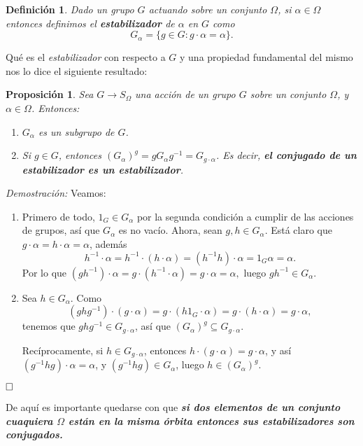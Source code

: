 \documentclass[12pt]{article}
\newtheorem{proposition}[theorem]{Proposición}
\newtheorem{definition}[theorem]{Definición}
\begin{document}
\begin{definition}Dado un grupo $G$ actuando sobre un conjunto $\Omega$, si $\alpha \in \Omega$ entonces definimos el \textbf{estabilizador} de $\alpha$ en $G$ como $$G_\alpha = \lbrace g \in G : g\cdot \alpha = \alpha \rbrace.$$
\end{definition}

Qué es el \textit{estabilizador} con respecto a $G$ y una propiedad fundamental del mismo nos lo dice el siguiente resultado:

\begin{proposition}\label{eq:coest}
Sea $G \longrightarrow S_\Omega$ una acción de un grupo $G$ sobre un conjunto $\Omega$, y $\alpha \in \Omega$. Entonces:

\begin{enumerate}
\item $G_{\alpha}$ es un subgrupo de $G$.
\item Si $g \in G$, entonces $(G_{\alpha})^{g} = gG_{\alpha}g^{-1} = G_{g \cdot \alpha}$. Es decir, \textbf{el conjugado de un estabilizador es un estabilizador}.
\end{enumerate}
\end{proposition}
\emph{Demostración: }Veamos:
\begin{enumerate}
\item Primero de todo, $1_{G} \in G_{\alpha}$ por la segunda condición a cumplir de las acciones de grupos, así que $G_{\alpha}$ es no vacío. Ahora, sean $g,h \in G_{\alpha}$. Está claro que $g \cdot \alpha = h \cdot \alpha = \alpha$, además $$h^{-1} \cdot \alpha = h^{-1}\cdot(h \cdot \alpha) = (h^{-1}h)\cdot \alpha = 1_{G} \alpha = \alpha.$$ Por lo que $(gh^{-1})\cdot \alpha= g\cdot(h^{-1}\cdot \alpha) = g\cdot \alpha= \alpha,$ luego $gh^{-1} \in G_{\alpha}.$
\item Sea $h \in G_{\alpha}$. Como  $$(ghg^{-1})\cdot(g\cdot \alpha) = g\cdot(h1_{G}\cdot \alpha)= g\cdot(h\cdot \alpha) = g\cdot \alpha,$$ tenemos que $ghg^{-1} \in G_{g\cdot \alpha}$, así que $(G_{\alpha})^{g} \subseteq G_{g\cdot \alpha}$.

Recíprocamente, si $h \in G_{g \cdot \alpha}$, entonces $h\cdot(g \cdot \alpha) = g \cdot \alpha$, y así $(g^{-1}hg)\cdot \alpha = \alpha$, y $(g^{-1}hg) \in G_{\alpha}$, luego $h \in (G_{\alpha})^{g}.$
\end{enumerate}

$\hfill \square$

De aquí es importante quedarse con que \textbf{\textit{si dos elementos de un conjunto cuaquiera $\Omega$ están en la misma órbita entonces sus estabilizadores son conjugados.}}
\end{document}
